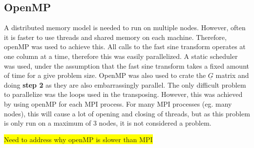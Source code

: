 \subsection{OpenMP}
\label{sub:OpenMP}
A distributed memory model is needed to run on multiple nodes. However, often it is faster to use threads and shared memory on each machine. Therefore, openMP was used to achieve this. All calls to the fast sine transform operates at one column at a time, therefore this was easily parallelized. A static scheduler was used, under the assumption that the fast sine transform takes a fixed amount of time for a give problem size. OpenMP was also used to crate the $\underline{G}$ matrix and doing \textbf{step 2} as they are also embarrassingly parallel. The only difficult problem to parallelize was the loops used in the transposing. However, this was achieved by using openMP for each MPI process. For many MPI processes (eg. many nodes), this will cause a lot of opening and closing of threads, but as this problem is only run on a maximum of 3 nodes, it is not considered a problem.
%

\colorbox{yellow}{Need to address why openMP is slower than MPI}
